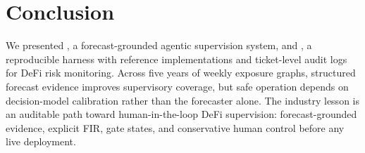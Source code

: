 \section{Conclusion}
\label{sec:discussion-conclusion}
\label{sec:lessons}
\label{sec:conclusion}

We presented \sysname{}, a forecast-grounded agentic supervision
system, and \benchname{}, a reproducible harness with reference
implementations and ticket-level audit logs for DeFi risk monitoring.
Across five years of weekly exposure graphs, structured forecast
evidence improves supervisory coverage, but safe operation depends on
decision-model calibration rather than the forecaster alone. The
industry lesson is an auditable path toward human-in-the-loop DeFi
supervision: forecast-grounded evidence, explicit FIR, gate states,
and conservative human control before any live deployment.

